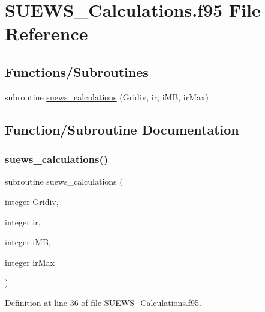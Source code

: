 \hypertarget{_s_u_e_w_s___calculations_8f95}{}\section{S\+U\+E\+W\+S\+\_\+\+Calculations.\+f95 File Reference}
\label{_s_u_e_w_s___calculations_8f95}
\subsection*{Functions/\+Subroutines}
\begin{DoxyCompactItemize}
\item 
subroutine \hyperlink{_s_u_e_w_s___calculations_8f95_a178f1acf059ccbc65e48be6eb7f37baf}{suews\+\_\+calculations} (Gridiv, ir, i\+MB, ir\+Max)
\end{DoxyCompactItemize}


\subsection{Function/\+Subroutine Documentation}
\mbox{\label{_s_u_e_w_s___calculations_8f95_a178f1acf059ccbc65e48be6eb7f37baf}} 
\subsubsection{\texorpdfstring{suews\+\_\+calculations()}{suews\_calculations()}}
{\footnotesize\ttfamily subroutine suews\+\_\+calculations (\begin{DoxyParamCaption}\item[{integer}]{Gridiv,  }\item[{integer}]{ir,  }\item[{integer}]{i\+MB,  }\item[{integer}]{ir\+Max }\end{DoxyParamCaption})}



Definition at line 36 of file S\+U\+E\+W\+S\+\_\+\+Calculations.\+f95.

